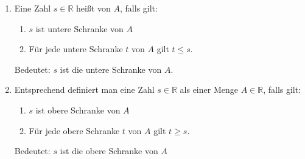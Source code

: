 \begin{enumerate}[label=\alph*)]
    \item Eine Zahl $s \in \mathbb{R}$ heißt  von $A$, falls gilt:
        \begin{enumerate}[label=\arabic*.]
            \item $s$ ist untere Schranke von $A$
            \item Für jede untere Schranke $t$ von $A$ gilt $t \leq s$.
        \end{enumerate}
        Bedeutet: $s$ ist die  untere Schranke von $A$.
    \item Entsprechend definiert man eine Zahl $s \in \mathbb{R}$ als  einer Menge $A \in \mathbb{R}$, falls gilt:
        \begin{enumerate}[label=\arabic*.]
            \item $s$ ist obere Schranke von $A$
            \item Für jede obere Schranke $t$ von $A$ gilt $t \geq s$.
        \end{enumerate}
        Bedeutet: $s$ ist die  obere Schranke von $A$
\end{enumerate}
